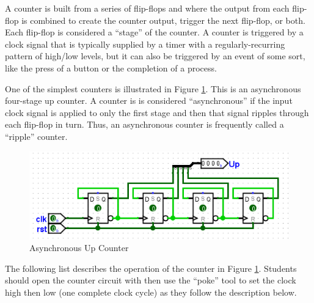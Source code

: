 A counter is built from a series of flip-flops and where the output from each flip-flop is combined to create the counter output, trigger the next flip-flop, or both. Each flip-flop is considered a ``stage'' of the counter. A counter is triggered by a clock signal that is typically supplied by a timer with a regularly-recurring pattern of high/low levels, but it can also be triggered by an event of some sort, like the press of a button or the completion of a process.

One of the simplest counters is illustrated in Figure \ref{fig:06-01}. This is an asynchronous four-stage up counter. A counter is is considered ``asynchronous'' if the input clock signal is applied to only the first stage and then that signal ripples through each flip-flop in turn. Thus, an asynchronous counter is frequently called a ``ripple'' counter.

\begin{figure}[H]
	\centering
	\includegraphics[width=\maxwidth{.95\linewidth}]{gfx/06-01}
	\caption{Asynchronous Up Counter}
	\label{fig:06-01}
\end{figure}

The following list describes the operation of the counter in Figure \ref{fig:06-01}. Students should open the counter circuit with \LE then use the ``poke'' tool to set the clock high then low (one complete clock cycle) as they follow the description below.

